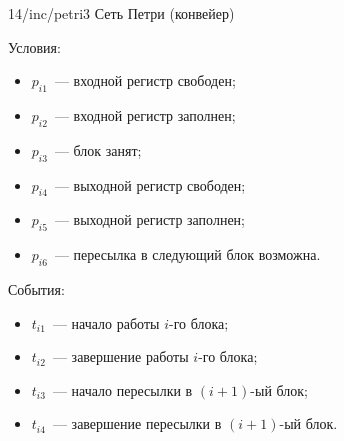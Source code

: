 \image
{\textwidth}
{14/inc/petri3}
{Сеть Петри (конвейер)}

Условия:

\begin{itemize}
    \item $p_{i1}$~--- входной регистр свободен;
    \item $p_{i2}$~--- входной регистр заполнен;
    \item $p_{i3}$~--- блок занят;
    \item $p_{i4}$~--- выходной регистр свободен;
    \item $p_{i5}$~--- выходной регистр заполнен;
    \item $p_{i6}$~--- пересылка в следующий блок возможна.
\end{itemize}

События:

\begin{itemize}
    \item $t_{i1}$~--- начало работы $i$-го блока;
    \item $t_{i2}$~--- завершение работы $i$-го блока;
    \item $t_{i3}$~--- начало пересылки в ${(i+1)}$-ый блок;
    \item $t_{i4}$~--- завершение пересылки в ${(i+1)}$-ый блок.
\end{itemize}

